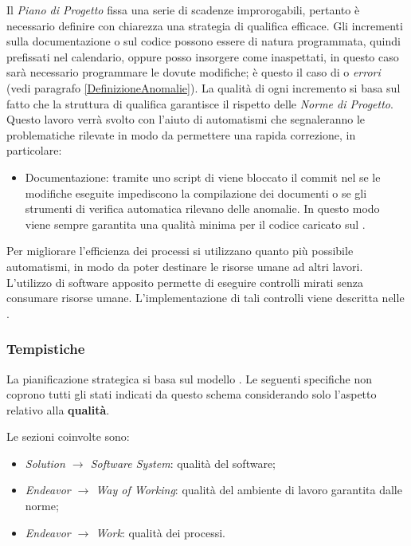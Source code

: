 		Il \emph{Piano di Progetto} fissa una serie di scadenze improrogabili, pertanto è necessario definire con chiarezza una strategia di qualifica efficace. Gli incrementi sulla documentazione o sul codice possono essere di natura programmata, quindi prefissati nel calendario, oppure posso insorgere come inaspettati, in questo caso sarà necessario programmare le dovute modifiche; è questo il caso di  o \emph{errori} (vedi paragrafo \ref{DefinizioneAnomalie}). La qualità di ogni incremento si basa sul fatto che la struttura di qualifica garantisce il rispetto delle \emph{Norme di Progetto}. Questo lavoro verrà svolto con l'aiuto di automatismi che segnaleranno le problematiche rilevate in modo da permettere una rapida correzione, in particolare:
		\begin{itemize}
			\item Documentazione: tramite uno script di  viene bloccato il commit nel  se le modifiche eseguite impediscono la compilazione dei documenti o se gli strumenti di verifica automatica rilevano delle anomalie. In questo modo viene sempre garantita una qualità minima per il codice caricato sul .
		\end{itemize}

	Per migliorare l'efficienza dei processi si utilizzano quanto più possibile automatismi, in modo da poter destinare le risorse umane ad altri lavori. L'utilizzo di software apposito permette di eseguire controlli mirati senza consumare risorse umane. L'implementazione di tali controlli viene descritta nelle \NormeDiProgetto.
	
		\subsubsection{Tempistiche}
		La pianificazione strategica si basa sul modello . Le seguenti specifiche non coprono tutti gli stati indicati da questo schema considerando solo l'aspetto relativo alla \textbf{qualità}. 
		
		Le sezioni coinvolte sono:
			\begin{itemize}
				\item \emph{Solution $\rightarrow$ Software System}: qualità del software;
				\item \emph{Endeavor $\rightarrow$ Way of Working}: qualità del ambiente di lavoro garantita dalle norme;
				\item \emph{Endeavor $\rightarrow$ Work}: qualità dei processi.
			\end{itemize}
		
